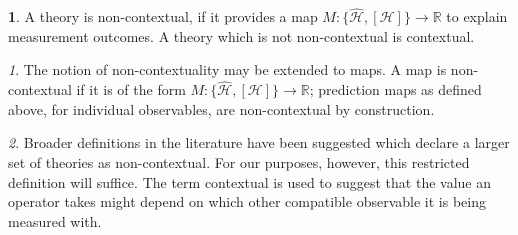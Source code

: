 \documentclass[british,aps,prl,superscriptaddress,nofootinbib,times,reprint]{revtex4-1}
\theoremstyle{plain}
\theoremstyle{plain}
\theoremstyle{definition}
\newtheorem{defn}{\protect\definitionname}
\theoremstyle{remark}
\theoremstyle{remark}
\newtheorem{defnrem}{\protect\remarkname}[defn]
\theoremstyle{remark}
\theoremstyle{plain}
\theoremstyle{plain}
\theoremstyle{plain}
\theoremstyle{definition}
\theoremstyle{definition}
\providecommand{\definitionname}{Definition}
\providecommand{\remarkname}{Remark}
\begin{document}
\begin{defn} A theory is non-contextual, if it
provides a map $M: \{
\hat{\mathcal{H}},[\mathcal{H}] \} \to\mathbb{R}$
to explain measurement outcomes. A theory which is
not non-contextual is contextual.\end{defn}


\begin{defnrem} The notion of non-contextuality may be
extended to maps. A map is non-contextual if it is
of the form $M: \{ \hat{\mathcal{H}},[\mathcal{H}]
\} \to\mathbb{R}$; prediction maps as defined above, for individual observables, are non-contextual by construction.  
\end{defnrem}
\begin{defnrem}
Broader definitions in the literature have been
suggested which declare a larger set of theories
as non-contextual. For our purposes, however, this
restricted definition will suffice. The term
contextual is used to suggest that the value an
operator takes might depend on which other
compatible observable it is being  measured with.
\end{defnrem}
\end{document}
